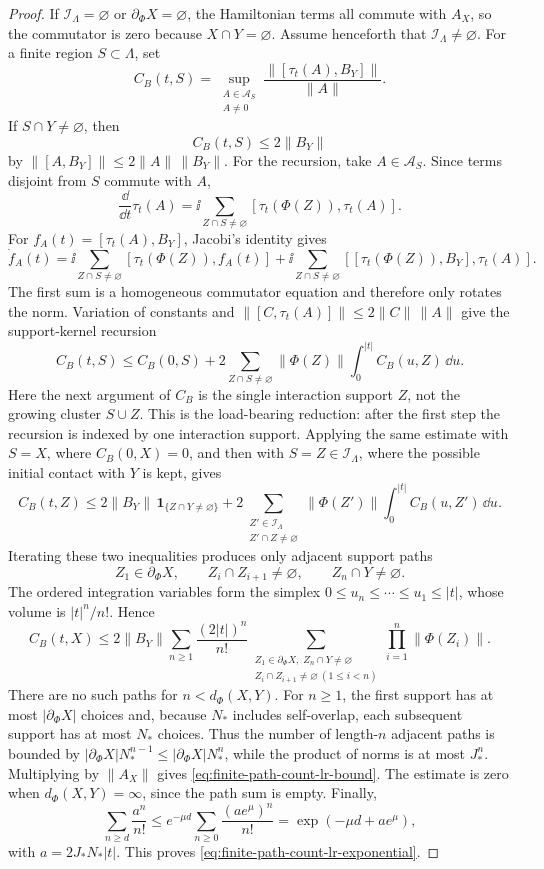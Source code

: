 \begin{proof}
If \(\mathcal I_\Lambda=\varnothing\) or \(\partial_\Phi X=\varnothing\), the
Hamiltonian terms all commute with \(A_X\), so the commutator is zero because
\(X\cap Y=\varnothing\).  Assume henceforth that \(\mathcal I_\Lambda\ne
\varnothing\).  For a finite region \(S\subset\Lambda\), set
\[
  C_B(t,S)
  =
  \sup_{\substack{A\in\mathcal A_S\\ A\ne0}}
  \frac{\|[\tau_t(A),B_Y]\|}{\|A\|}.
\]
If \(S\cap Y\ne\varnothing\), then
\[
  C_B(t,S)\le 2\|B_Y\|
\]
by \(\|[A,B_Y]\|\le2\|A\|\,\|B_Y\|\).  For the recursion, take
\(A\in\mathcal A_S\).  Since terms disjoint from \(S\) commute with \(A\),
\[
  \frac{\dd}{\dd t}\tau_t(A)
  =
  \ii\sum_{Z\cap S\ne\varnothing}
  [\tau_t(\Phi(Z)),\tau_t(A)] .
\]
For \(f_A(t)=[\tau_t(A),B_Y]\), Jacobi's identity gives
\[
  \dot f_A(t)
  =
  \ii\sum_{Z\cap S\ne\varnothing}
  [\tau_t(\Phi(Z)),f_A(t)]
  +
  \ii\sum_{Z\cap S\ne\varnothing}
  [[\tau_t(\Phi(Z)),B_Y],\tau_t(A)] .
\]
The first sum is a homogeneous commutator equation and therefore only rotates
the norm.  Variation of constants and
\(\|[C,\tau_t(A)]\|\le2\|C\|\,\|A\|\) give the support-kernel recursion
\[
  C_B(t,S)
  \le
  C_B(0,S)
  +
  2\sum_{Z\cap S\ne\varnothing}\|\Phi(Z)\|
  \int_0^{|t|} C_B(u,Z)\,\dd u .
\]
Here the next argument of \(C_B\) is the single interaction support \(Z\), not
the growing cluster \(S\cup Z\).  This is the load-bearing reduction: after the
first step the recursion is indexed by one interaction support.  Applying the
same estimate with \(S=X\), where \(C_B(0,X)=0\), and then with
\(S=Z\in\mathcal I_\Lambda\), where the possible initial contact with \(Y\) is
kept, gives
\[
  C_B(t,Z)
  \le
  2\|B_Y\|\,\mathbf 1_{\{Z\cap Y\ne\varnothing\}}
  +
  2\sum_{\substack{Z'\in\mathcal I_\Lambda\\ Z'\cap Z\ne\varnothing}}
  \|\Phi(Z')\|\int_0^{|t|} C_B(u,Z')\,\dd u .
\]
Iterating these two inequalities produces only adjacent support paths
\[
  Z_1\in\partial_\Phi X,\qquad
  Z_i\cap Z_{i+1}\ne\varnothing,\qquad
  Z_n\cap Y\ne\varnothing .
\]
The ordered integration variables form the simplex
\(0\le u_n\le\cdots\le u_1\le |t|\), whose volume is \(|t|^n/n!\).  Hence
\[
  C_B(t,X)
  \le
  2\|B_Y\|
  \sum_{n\ge1}
  \frac{(2|t|)^n}{n!}
  \sum_{\substack{
    Z_1\in\partial_\Phi X,\; Z_n\cap Y\ne\varnothing\\
    Z_i\cap Z_{i+1}\ne\varnothing\ (1\le i<n)}}
  \prod_{i=1}^n\|\Phi(Z_i)\| .
\]
There are no such paths for \(n<d_\Phi(X,Y)\).  For \(n\ge1\), the first
support has at most \(|\partial_\Phi X|\) choices and, because \(N_*\) includes
self-overlap, each subsequent support has at most \(N_*\) choices.  Thus the
number of length-\(n\) adjacent paths is bounded by
\(|\partial_\Phi X|N_*^{n-1}\le|\partial_\Phi X|N_*^n\), while the product of
norms is at most \(J_*^n\).  Multiplying by \(\|A_X\|\) gives
\eqref{eq:finite-path-count-lr-bound}.  The estimate is zero when
\(d_\Phi(X,Y)=\infty\), since the path sum is empty.  Finally,
\[
  \sum_{n\ge d}\frac{a^n}{n!}
  \le
  e^{-\mu d}\sum_{n\ge0}\frac{(ae^\mu)^n}{n!}
  =
  \exp(-\mu d+ae^\mu),
\]
with \(a=2J_*N_*|t|\).  This proves
\eqref{eq:finite-path-count-lr-exponential}.
\end{proof}

